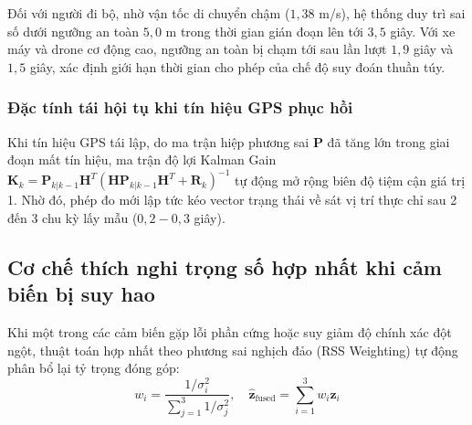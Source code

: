 Đối với người đi bộ, nhờ vận tốc di chuyển chậm ($1{,}38$ m/s), hệ thống duy trì sai số dưới ngưỡng an toàn $5{,}0$ m trong thời gian gián đoạn lên tới $3{,}5$ giây. Với xe máy và drone cơ động cao, ngưỡng an toàn bị chạm tới sau lần lượt $1{,}9$ giây và $1{,}5$ giây, xác định giới hạn thời gian cho phép của chế độ suy đoán thuần túy.

\subsubsection{Đặc tính tái hội tụ khi tín hiệu GPS phục hồi}

\hspace{0.5cm} Khi tín hiệu GPS tái lập, do ma trận hiệp phương sai $\mathbf{P}$ đã tăng lớn trong giai đoạn mất tín hiệu, ma trận độ lợi Kalman Gain $\mathbf{K}_k = \mathbf{P}_{k|k-1} \mathbf{H}^T (\mathbf{H} \mathbf{P}_{k|k-1} \mathbf{H}^T + \mathbf{R}_k)^{-1}$ tự động mở rộng biên độ tiệm cận giá trị 1. Nhờ đó, phép đo mới lập tức kéo vector trạng thái về sát vị trí thực chỉ sau 2 đến 3 chu kỳ lấy mẫu ($0{,}2 - 0{,}3$ giây).

\subsection{Cơ chế thích nghi trọng số hợp nhất khi cảm biến bị suy hao}

\hspace{0.5cm} Khi một trong các cảm biến gặp lỗi phần cứng hoặc suy giảm độ chính xác đột ngột, thuật toán hợp nhất theo phương sai nghịch đảo (RSS Weighting) tự động phân bổ lại tỷ trọng đóng góp:
\begin{equation}
w_i = \frac{1/\sigma_i^2}{\sum_{j=1}^3 1/\sigma_j^2}, \quad \hat{\mathbf{z}}_{\text{fused}} = \sum_{i=1}^3 w_i \mathbf{z}_i
\label{eq:rss-adaptive-weighting-formula}
\end{equation}

\begin{table}[H]
\centering
\caption{Trọng số hợp nhất cảm biến tự thích nghi trong các điều kiện sự cố đo lường}
\label{tab:fusion-weights}
\end{table}

